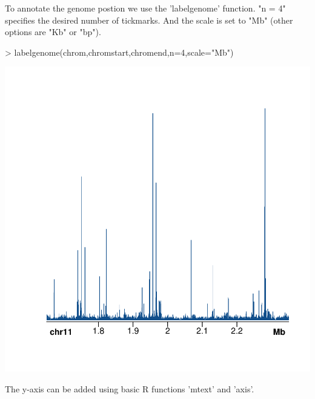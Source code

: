 \documentclass{article}
\begin{document}
To annotate the genome postion we use the 'labelgenome' function.  "n = 4" specifies the desired number of tickmarks.  And the scale is set to "Mb" (other options are "Kb" or "bp").

\begin{center}
\begin{Schunk}
\begin{Sinput}
> labelgenome(chrom,chromstart,chromend,n=4,scale="Mb")
\end{Sinput}
\end{Schunk}

\includegraphics{Sushi-007}
\end{center}


The y-axis can be added using basic R functions 'mtext' and 'axis'.
\end{document}
